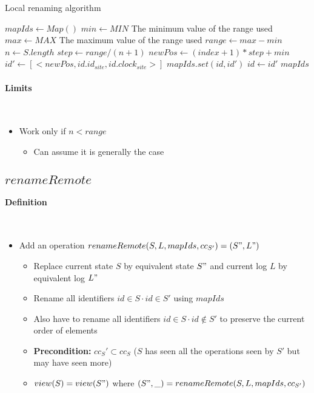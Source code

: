 \documentclass[a4paper]{article}
\begin{document}
\begin{algorithm}
  \caption{Local renaming algorithm}
  \label{alg:local-rename}
  \begin{algorithmic}
      \State $mapIds \gets Map()$
      \State $min \gets MIN$
      \Comment The minimum value of the range used
      \State $max \gets MAX$
      \Comment The maximum value of the range used
      \State $range \gets max - min$
      \State $n \gets S.length$
      \State $step \gets range / (n + 1)$
        \State $newPos \gets (index + 1) * step + min$
        \State $id' \gets [<newPos, id.id_{site}, id.clock_{site}>]$
        \State $mapIds.set(id, id')$
        \State $id \gets id'$
      \EndFor
      \State \Return $mapIds$
    \EndFunction
  \end{algorithmic}
\end{algorithm}

\paragraph{Limits}~\\

\begin{itemize}
  \item Work only if $n < range$
  \begin{itemize}
    \item Can assume it is generally the case
  \end{itemize}
\end{itemize}

\subsection{$renameRemote$}

\paragraph{Definition}~\\

\begin{itemize}
  \item Add an operation $renameRemote(S, L, mapIds, cc_{S'}) = (S", L")$
  \begin{itemize}
    \item Replace current state $S$ by equivalent state $S"$ and current log $L$ by equivalent log $L"$
    \item Rename all identifiers $id \in S \cdot id \in S'$ using $mapIds$
    \item Also have to rename all identifiers $id \in S \cdot id \notin S'$ to preserve the current order of elements
    \item \textbf{Precondition: } $cc_S' \subset cc_S$ ($S$ has seen all the operations seen by $S'$ but may have seen more)
    \item $view(S) = view(S")$ where $(S", \_) = renameRemote(S, L, mapIds, cc_{S'})$
  \end{itemize}
\end{itemize}
\end{document}
